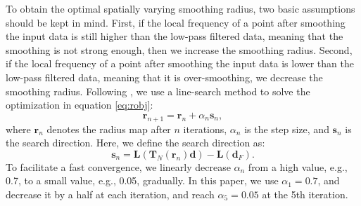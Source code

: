 To obtain the optimal spatially varying smoothing radius, two basic assumptions should be kept in mind. First, if the local frequency of a point after smoothing the input data is still higher than the low-pass filtered data, meaning that the smoothing is not strong enough, then we increase the smoothing radius. Second, if the local frequency of a point after smoothing the input data is lower than the low-pass filtered data, meaning that it is over-smoothing, we decrease the smoothing radius. Following \cite{greer2018matching}, we use a line-search method to solve the optimization in equation \ref{eq:robj}:
\begin{equation}
\label{eq:r}
\mathbf{r}_{n+1} = \mathbf{r}_{n} + \alpha_n \mathbf{s}_n,
\end{equation}
where $\mathbf{r}_{n}$ denotes the radius map after $n$ iterations, $\alpha_n$ is the step size, and $\mathbf{s}_n$ is the search direction. Here, we define the search direction as:
\begin{equation}
\label{eq:r}
\mathbf{s}_{n} = \mathbf{L}(\mathbf{T}_N(\mathbf{r}_n) \mathbf{d}) -\mathbf{L}(\mathbf{d}_F).
\end{equation}
To facilitate a fast convergence, we linearly decrease $\alpha_n$ from a high value, e.g., 0.7, to a small value, e.g., 0.05, gradually. In this paper, we use  $\alpha_1=0.7$, and decrease it by a half at each iteration, and reach $\alpha_5=0.05$ at the 5th iteration. 

